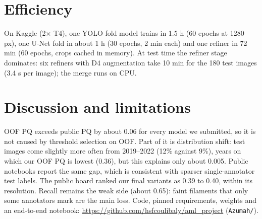 \documentclass[10pt,twocolumn]{article}
\begin{document}
\section{Efficiency}
On Kaggle (2$\times$ T4), one YOLO fold model trains in 1.5 h (60 epochs at 1280 px), one U-Net fold in
about 1 h (30 epochs, 2 min each) and one refiner in 72 min (60 epochs, crops cached in memory). At test
time the refiner stage dominates: six refiners with D4 augmentation take 10 min for the 180 test images
(3.4 s per image); the merge runs on CPU.

\section{Discussion and limitations}
OOF PQ exceeds public PQ by about 0.06 for every model we submitted, so it is not caused by threshold selection
on OOF. Part of it is distribution shift: test images come slightly more often from 2019--2022 (12\% against
9\%), years on which our OOF PQ is lowest (0.36), but this explains only about 0.005. Public notebooks
report the same gap, which is consistent with sparser single-annotator test labels.
The public board ranked our final variants as 0.39 to 0.40, within its resolution. Recall remains the weak
side (about 0.65): faint filaments that only some annotators mark are the main loss. Code, pinned
requirements, weights and an end-to-end notebook: \url{https://github.com/hsfcoulibaly/aml_project}
(\texttt{Azumah/}).
\end{document}
